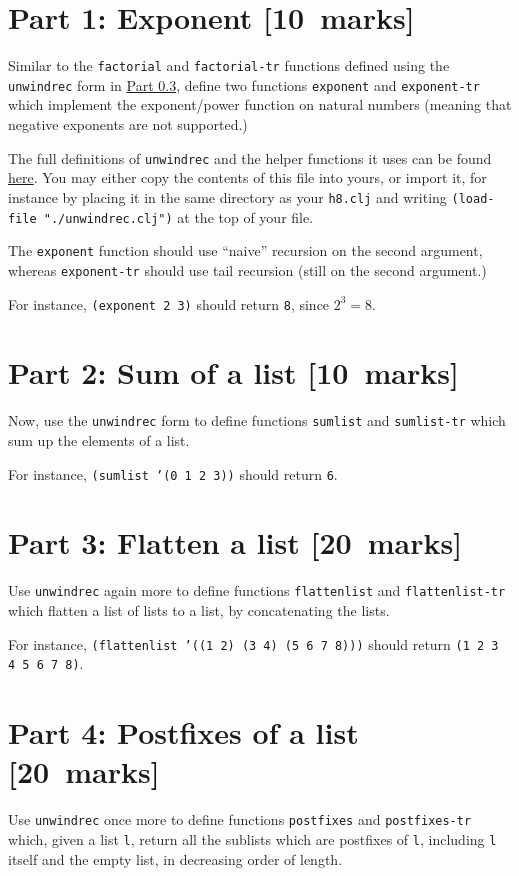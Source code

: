 \documentclass[11pt]{article}
\begin{document}
\section*{Part 1: Exponent              [10 marks]}
\label{sec:orgb915a74}
Similar to the \texttt{factorial} and \texttt{factorial-tr} functions defined
using the \texttt{unwindrec} form in \hyperref[sec:orgc0119f6]{Part 0.3},
define two functions \texttt{exponent} and \texttt{exponent-tr} which
implement the exponent/power function on natural numbers
(meaning that negative exponents are not supported.)

The full definitions of \texttt{unwindrec} and the helper functions it uses
can be found \href{./src/h8/unwindrec.clj}{here}. You may either copy the contents of this file into yours,
or import it, for instance by placing it in the same directory
as your \texttt{h8.clj} and writing \texttt{(load-file "./unwindrec.clj")} at the top of your file.

The \texttt{exponent} function should use “naive” recursion on the second argument,
whereas \texttt{exponent-tr} should use tail recursion (still on the second argument.)

For instance, \texttt{(exponent 2 3)} should return \texttt{8}, since \(2^{3} = 8\).

\section*{Part 2: Sum of a list         [10 marks]}
\label{sec:org46f7b54}
Now, use the \texttt{unwindrec} form to define functions \texttt{sumlist} and \texttt{sumlist-tr} which
sum up the elements of a list.

For instance, \texttt{(sumlist '(0 1 2 3))} should return \texttt{6}.

\section*{Part 3: Flatten a list        [20 marks]}
\label{sec:org2e9762f}
Use \texttt{unwindrec} again more to define functions \texttt{flattenlist} and \texttt{flattenlist-tr} which
flatten a list of lists to a list, by concatenating the lists.

For instance, \texttt{(flattenlist '((1 2) (3 4) (5 6 7 8)))} should return \texttt{(1 2 3 4 5 6 7 8)}.

\section*{Part 4: Postfixes of a list   [20 marks]}
\label{sec:org36488f0}
Use \texttt{unwindrec} once more to define functions \texttt{postfixes} and \texttt{postfixes-tr} which,
given a list \texttt{l}, return all the sublists which are postfixes of \texttt{l},
including \texttt{l} itself and the empty list, in decreasing order of length.
\end{document}
